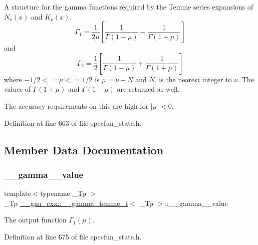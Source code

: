 A structure for the gamma functions required by the Temme series expansions of $ N_\nu(x) $ and $ K_\nu(x) $. \[ \Gamma_1 = \frac{1}{2\mu} \left[\frac{1}{\Gamma(1 - \mu)} - \frac{1}{\Gamma(1 + \mu)}\right] \] and \[ \Gamma_2 = \frac{1}{2} \left[\frac{1}{\Gamma(1 - \mu)} + \frac{1}{\Gamma(1 + \mu)}\right] \] where $ -1/2 <= \mu <= 1/2 $ is $ \mu = \nu - N $ and $ N $. is the nearest integer to $ \nu $. The values of $ \Gamma(1 + \mu) $ and $ \Gamma(1 - \mu) $ are returned as well. 

The accuracy requirements on this are high for $ |\mu| < 0 $. 

Definition at line 663 of file specfun\+\_\+state.\+h.



\subsection{Member Data Documentation}
\mbox{\label{struct____gnu__cxx_1_1____gamma__temme__t_a5cd3cdcf5479d232d3ea118c69198215}} 
\subsubsection{\texorpdfstring{\+\_\+\+\_\+gamma\+\_\+\_\+value}{\_\_gamma\_1\_value}}
{\footnotesize\ttfamily template$<$typename \+\_\+\+Tp $>$ \\
\+\_\+\+Tp \hyperlink{struct____gnu__cxx_1_1____gamma__temme__t}{\+\_\+\+\_\+gnu\+\_\+cxx\+::\+\_\+\+\_\+gamma\+\_\+temme\+\_\+t}$<$ \+\_\+\+Tp $>$\+::\+\_\+\+\_\+gamma\+\_\+\_\+value}



The output function $ \Gamma_1(\mu) $. 



Definition at line 675 of file specfun\+\_\+state.\+h.

\mbox{\label{struct____gnu__cxx_1_1____gamma__temme__t_af3113befce3b6bc9c561472fbaff4520}} 
